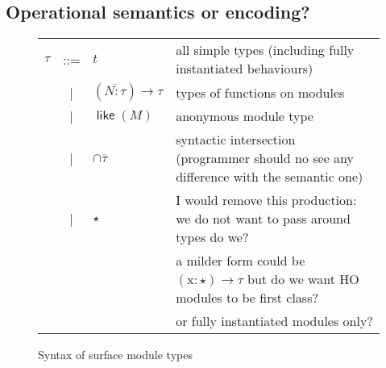 \documentclass[a4paper,10pt]{article}
\DeclareMathOperator{\kwopq}{\textsf{\$opaque}}
\DeclareMathOperator{\kwtp}{\textsf{\$type}}
\DeclareMathOperator{\kwmdl}{\textsf{\$module}}
\DeclareMathOperator{\kwclbk}{\textsf{\$callback}}
\DeclareMathOperator{\kwlike}{\textsf{like}}
\newcommand{\tx}{\textrm{x}}
\begin{document}
\subsection{Operational semantics or encoding?}
\begin{figure}
  \begin{tabular}{r c ll}
    $\tau$ & ::= & $t$                 &\color{Gray} all simple types (including fully instantiated behaviours)\\
    & | & $\left(\overline{N:\tau}\right)\rightarrow \tau$ &\color{Gray} types of functions on modules\\
    & | & $\kwlike(M)$                 &\color{Gray}anonymous module type\\
    & | & $\cap\overline{\tau}$        &\color{Gray} syntactic intersection (programmer should no see any difference with the semantic one) \\
    & | & $\star$            & \color{bordeaux} I would remove this production: we do not want to pass around types do we?\\
                                      &&&\color{bordeaux} a milder form could be $(\tx:\star)\to\tau$ but do we want HO modules to be first class?\\        
                                      &&&\color{bordeaux} or fully instantiated modules only?
  \end{tabular}
  \caption{Syntax of surface module types}
\end{figure}
\end{document}
